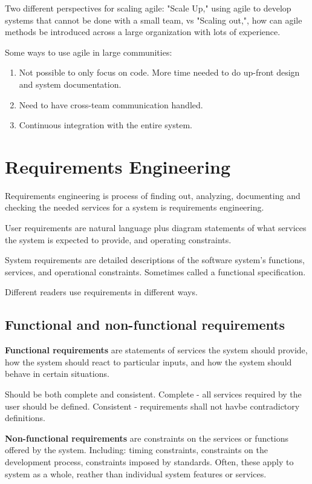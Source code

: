 \documentclass{article}
\begin{document}
Two different perspectives for scaling agile: "Scale Up," using agile to develop systems that cannot be done with a small team, vs "Scaling out,", how can agile methods be introduced across a large organization with lots of experience.

Some ways to use agile in large communities:
\begin{enumerate}
    \item Not possible to only focus on code.  More time needed to do up-front design and system documentation.
    \item Need to have cross-team communication handled.
    \item Continuous integration with the entire system.
\end{enumerate}

\section{Requirements Engineering}
Requirements engineering is process of finding out, analyzing, documenting and checking the needed services for a system is requirements engineering.

User requirements are natural language plus diagram statements of what services the system is expected to provide, and operating constraints.

System requirements are detailed descriptions of the software system's functions, services, and operational constraints.  Sometimes called a functional specification.

Different readers use requirements in different ways.
\subsection{Functional and non-functional requirements}
\textbf{Functional requirements} are statements of services the system should provide, how the system should react to particular inputs, and how the system should behave in certain situations.

Should be both complete and consistent.  Complete - all services required by the user should be defined.  Consistent - requirements shall not havbe contradictory definitions.

\textbf{Non-functional requirements} are constraints on the services or functions offered by the system.  Including: timing constraints, constraints on the development process, constraints imposed by standards.  Often, these apply to system as a whole, reather than individual system features or services.
\end{document}

